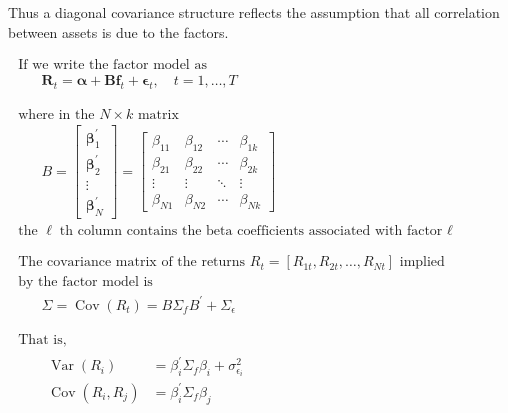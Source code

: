 \documentclass[11pt]{article}
\begin{document}
Thus a diagonal covariance structure reflects the assumption that all
correlation between assets is due to the factors.

\(\begin{array}{l}{\text { If we write the factor model as }} \\ {\qquad \boldsymbol{R}_{t}=\boldsymbol{\alpha}+\boldsymbol{B} \boldsymbol{f}_{t}+\boldsymbol{\epsilon}_{t}, \quad t=1, \ldots, T}\end{array}\)

\(\begin{array}{l}{\text { where in the } N \times k \text { matrix }} \\ {\qquad B=\left[\begin{array}{c}{\boldsymbol{\beta}_{1}^{\prime}} \\ {\boldsymbol{\beta}_{2}^{\prime}} \\ {\vdots} \\ {\boldsymbol{\beta}_{N}^{\prime}}\end{array}\right]=\left[\begin{array}{cccc}{\beta_{11}} & {\beta_{12}} & {\cdots} & {\beta_{1 k}} \\ {\beta_{21}} & {\beta_{22}} & {\cdots} & {\beta_{2 k}} \\ {\vdots} & {\vdots} & {\ddots} & {\vdots} \\ {\beta_{N 1}} & {\beta_{N 2}} & {\cdots} & {\beta_{N k}}\end{array}\right]} \\ {\text { the }} \ell {\text {th column contains the beta coefficients associated with factor } \ell}\end{array}\)

\(\begin{array}{l}{\text { The covariance matrix of the returns } R_{t}=\left[R_{1 t}, R_{2 t}, \ldots, R_{N t}\right] \text { implied }} \\ {\text { by the factor model is }} \\ {\qquad \Sigma=\operatorname{Cov}\left(R_{t}\right)=B \Sigma_{f} B^{\prime}+\Sigma_{\epsilon}}\end{array}\)

\(\begin{array}{l}{\text { That is, }} \\ {\qquad \begin{aligned} \operatorname{Var}\left(R_{i}\right) &=\beta_{i}^{\prime} \Sigma_{f} \beta_{i}+\sigma_{\epsilon_{i}}^{2} \\ \operatorname{Cov}\left(R_{i}, R_{j}\right) &=\beta_{i}^{\prime} \Sigma_{f} \beta_{j} \end{aligned}}\end{array}\)
\end{document}

